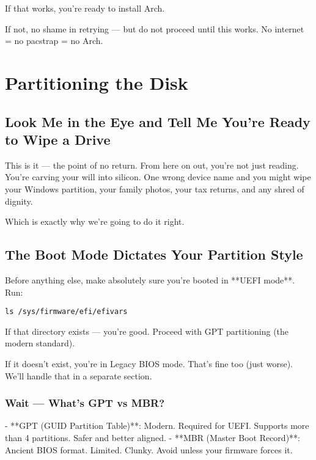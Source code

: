 \documentclass[12pt,openany]{book}
\begin{document}
If that works, you're ready to install Arch.

If not, no shame in retrying — but do not proceed until this works. No internet = no pacstrap = no Arch.

\clearpage

\chapter{Partitioning the Disk}

\section*{Look Me in the Eye and Tell Me You're Ready to Wipe a Drive}

This is it — the point of no return. From here on out, you’re not just reading. You’re carving your will into silicon. One wrong device name and you might wipe your Windows partition, your family photos, your tax returns, and any shred of dignity.

Which is exactly why we’re going to do it right.

\section{The Boot Mode Dictates Your Partition Style}

Before anything else, make absolutely sure you’re booted in **UEFI mode**. Run:

\begin{lstlisting}
ls /sys/firmware/efi/efivars
\end{lstlisting}

If that directory exists — you're good. Proceed with GPT partitioning (the modern standard).

If it doesn’t exist, you're in Legacy BIOS mode. That’s fine too (just worse). We’ll handle that in a separate section.

\subsection*{Wait — What’s GPT vs MBR?}

- **GPT (GUID Partition Table)**: Modern. Required for UEFI. Supports more than 4 partitions. Safer and better aligned.
- **MBR (Master Boot Record)**: Ancient BIOS format. Limited. Clunky. Avoid unless your firmware forces it.
\end{document}
